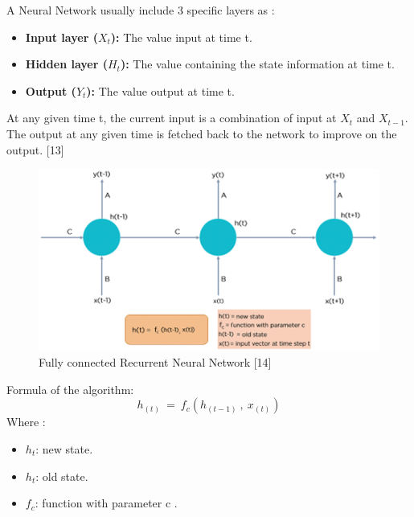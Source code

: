 \documentclass{ieeeojies}
\begin{document}
A Neural Network usually include 3 specific layers as :
\begin{itemize}
    \item \textbf{Input layer (\(X_t\)): } The value input at time t.
\end{itemize}
\begin{itemize}
    \item \textbf{Hidden layer (\(H_t\)):  } The value containing the state information at time t.
\end{itemize}
\begin{itemize}
    \item \textbf{Output (\(Y_t\)):  } The value output at time t.
\end{itemize}

At any given time t, the current input is a combination of input at \(X_t\) and \(X_{t-1}\). The output at any given time is fetched back to the network to improve on the output. [13]


 \begin{figure}[H]
    \centering
    \begin{minipage}{0.50\textwidth}
    \centering
    \includegraphics[width=1\textwidth]{Fully connected RNN.png}
    \caption{Fully connected Recurrent Neural Network [14]}
    \label{fig:1}
    \end{minipage}
\end{figure}
Formula of the algorithm:
\[h_{(t)}\ =\ f_c(h_{(t-1)}\ ,\ x_{(t)})\]
Where : 
\begin{itemize}
    \item 	\(h_t\): new state.
\end{itemize}
\begin{itemize}
     \item \(h_t\): old state.
 \end{itemize}
 \begin{itemize}
     \item \(f_c\): function with parameter c .
 \end{itemize}
\end{document}
